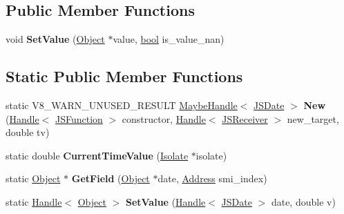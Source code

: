 \subsection*{Public Member Functions}
\begin{DoxyCompactItemize}
\item 
\mbox{\label{classv8_1_1internal_1_1JSDate_a23103dbde943e9378b3dcaa836195066}} 
void {\bfseries Set\+Value} (\mbox{\hyperlink{classv8_1_1internal_1_1Object}{Object}} $\ast$value, \mbox{\hyperlink{classbool}{bool}} is\+\_\+value\+\_\+nan)
\end{DoxyCompactItemize}
\subsection*{Static Public Member Functions}
\begin{DoxyCompactItemize}
\item 
\mbox{\label{classv8_1_1internal_1_1JSDate_ac3b1609096d2061caf9e0ce814ae879d}} 
static V8\+\_\+\+W\+A\+R\+N\+\_\+\+U\+N\+U\+S\+E\+D\+\_\+\+R\+E\+S\+U\+LT \mbox{\hyperlink{classv8_1_1internal_1_1MaybeHandle}{Maybe\+Handle}}$<$ \mbox{\hyperlink{classv8_1_1internal_1_1JSDate}{J\+S\+Date}} $>$ {\bfseries New} (\mbox{\hyperlink{classv8_1_1internal_1_1Handle}{Handle}}$<$ \mbox{\hyperlink{classv8_1_1internal_1_1JSFunction}{J\+S\+Function}} $>$ constructor, \mbox{\hyperlink{classv8_1_1internal_1_1Handle}{Handle}}$<$ \mbox{\hyperlink{classv8_1_1internal_1_1JSReceiver}{J\+S\+Receiver}} $>$ new\+\_\+target, double tv)
\item 
\mbox{\label{classv8_1_1internal_1_1JSDate_a953d857f4a4027129fc10cdf45f63400}} 
static double {\bfseries Current\+Time\+Value} (\mbox{\hyperlink{classv8_1_1internal_1_1Isolate}{Isolate}} $\ast$isolate)
\item 
\mbox{\label{classv8_1_1internal_1_1JSDate_a623e8856717c9069c1032e17b74750c5}} 
static \mbox{\hyperlink{classv8_1_1internal_1_1Object}{Object}} $\ast$ {\bfseries Get\+Field} (\mbox{\hyperlink{classv8_1_1internal_1_1Object}{Object}} $\ast$date, \mbox{\hyperlink{classuintptr__t}{Address}} smi\+\_\+index)
\item 
\mbox{\label{classv8_1_1internal_1_1JSDate_a98f1de1a5d8e4ada213e30bc94f149f8}} 
static \mbox{\hyperlink{classv8_1_1internal_1_1Handle}{Handle}}$<$ \mbox{\hyperlink{classv8_1_1internal_1_1Object}{Object}} $>$ {\bfseries Set\+Value} (\mbox{\hyperlink{classv8_1_1internal_1_1Handle}{Handle}}$<$ \mbox{\hyperlink{classv8_1_1internal_1_1JSDate}{J\+S\+Date}} $>$ date, double v)
\end{DoxyCompactItemize}

